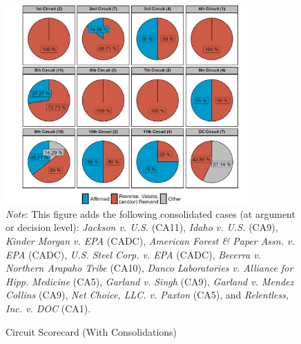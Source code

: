 \begin{landscape}
\begin{figure}[H]
\centering
\caption{Circuit Scorecard (With Consolidations)}
\vspace{2.5mm}
\includegraphics[width = 0.85\textwidth]{Figures/statpack_figures/circuit_scorecard_with_consolidations .png} \\
\vspace{2.5mm}
\footnotesize{\emph{Note}: This figure adds the following consolidated cases (at argument or decision level): \emph{Jackson v. U.S.} (CA11), \emph{Idaho v. U.S.} (CA9), \emph{Kinder Morgan v. EPA} (CADC), \emph{American Forest \& Paper Assn. v. EPA} (CADC), \emph{U.S. Steel Corp. v. EPA} (CADC), \emph{Becerra v. Northern Arapaho Tribe} (CA10), \emph{Danco Laboratories v. Alliance for Hipp. Medicine} (CA5), \emph{Garland v. Singh} (CA9), \emph{Garland v. Mendez Collins} (CA9), \emph{Net Choice, LLC. v. Paxton} (CA5), and \emph{Relentless, Inc. v. DOC} (CA1).}
\end{figure}
\end{landscape}

